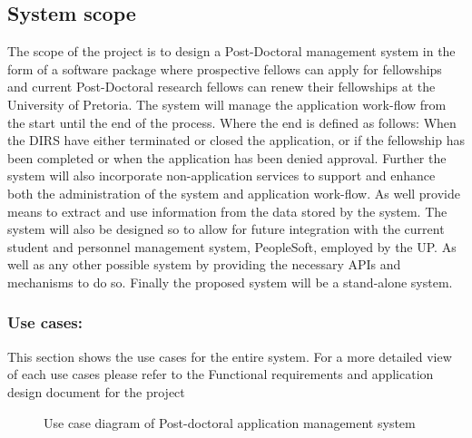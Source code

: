 \documentclass[12pt]{article}
\begin{document}
\subsection{System scope}
	
The scope of the project is to design a Post-Doctoral management system in the form of a software package where prospective fellows can apply for fellowships and current Post-Doctoral research fellows can renew their fellowships at the University of Pretoria. The system will manage the application work-flow from the start until the end of the process. Where the end is defined as follows: When the DIRS have either terminated or closed the application, or if the fellowship has been completed or when the application has been denied approval. Further the system will also incorporate non-application services to support and enhance both the administration of the system and application work-flow. As well provide means to extract and use information from the data stored by the system. The system will also be designed so to allow for future integration with the current student and personnel management system, PeopleSoft, employed by the UP. As well as any other possible system by providing the necessary APIs and mechanisms to do so. Finally the proposed system will be a stand-alone system.
\vspace{0.2in}

\subsubsection{Use cases:}
This section shows the use cases for the entire system. For a more  detailed view of each use cases please refer to the Functional requirements and application design document for the project 
\begin{figure}[H]
\centering	
{}
\caption{Use case diagram of Post-doctoral application management system}
\end{figure}
\end{document}
